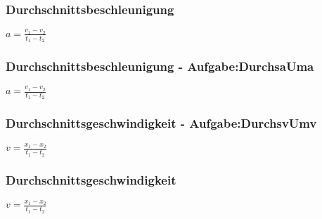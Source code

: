 \subsubsection{Durchschnittsbeschleunigung} 
\begin{minipage}{0.45\textwidth} 
$ a = \frac{v_{1}  - v_{2} }{t_{1}  - t_{2} } $\\ 
\end{minipage} 
\begin{minipage}{0.45\textwidth} 
 
\end{minipage} 
\subsubsection{Durchschnittsbeschleunigung - Aufgabe:DurchsaUma} 
\begin{minipage}{0.45\textwidth} 
$ a = \frac{v_{1}  - v_{2} }{t_{1}  - t_{2} } $\\ 
\end{minipage} 
\begin{minipage}{0.45\textwidth} 
 
\end{minipage} 
\subsubsection{Durchschnittsgeschwindigkeit - Aufgabe:DurchsvUmv} 
\begin{minipage}{0.45\textwidth} 
$ v = \frac{x_{1}  - x_{2} }{t_{1}  - t_{2} } $\\ 
\end{minipage} 
\begin{minipage}{0.45\textwidth} 
 
\end{minipage} 
\subsubsection{Durchschnittsgeschwindigkeit} 
\begin{minipage}{0.45\textwidth} 
$ v = \frac{x_{1}  - x_{2} }{t_{1}  - t_{2} } $\\ 
\end{minipage} 
\begin{minipage}{0.45\textwidth} 
 
\end{minipage} 
